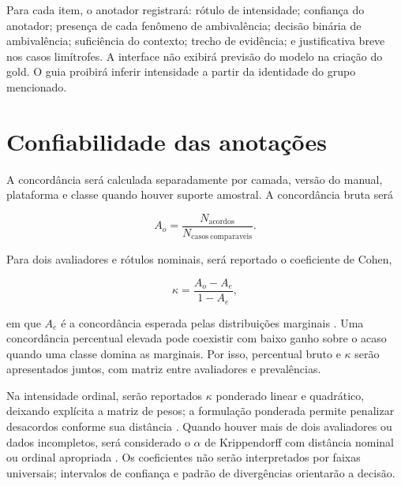 Para cada item, o anotador registrará: rótulo de intensidade; confiança do anotador; presença de cada fenômeno de ambivalência; decisão binária de ambivalência; suficiência do contexto; trecho de evidência; e justificativa breve nos casos limítrofes. A interface não exibirá previsão do modelo na criação do gold. O guia proibirá inferir intensidade a partir da identidade do grupo mencionado.

\section{Confiabilidade das anotações}
\label{sec:confiabilidade}

A concordância será calculada separadamente por camada, versão do manual, plataforma e classe quando houver suporte amostral. A concordância bruta será

\[
A_o=\frac{N_{\mathrm{acordos}}}{N_{\mathrm{casos\ comparaveis}}}.
\]

Para dois avaliadores e rótulos nominais, será reportado o coeficiente de Cohen,

\[
\kappa=\frac{A_o-A_e}{1-A_e},
\]

em que \(A_e\) é a concordância esperada pelas distribuições marginais \cite{cohen1960}. Uma concordância percentual elevada pode coexistir com baixo ganho sobre o acaso quando uma classe domina as marginais. Por isso, percentual bruto e \(\kappa\) serão apresentados juntos, com matriz entre avaliadores e prevalências.

Na intensidade ordinal, serão reportados \(\kappa\) ponderado linear e quadrático, deixando explícita a matriz de pesos; a formulação ponderada permite penalizar desacordos conforme sua distância \cite{cohen1968}. Quando houver mais de dois avaliadores ou dados incompletos, será considerado o \(\alpha\) de Krippendorff com distância nominal ou ordinal apropriada \cite{hayeskrippendorff2007,artsteinpoesio2008}. Os coeficientes não serão interpretados por faixas universais; intervalos de confiança e padrão de divergências orientarão a decisão.

